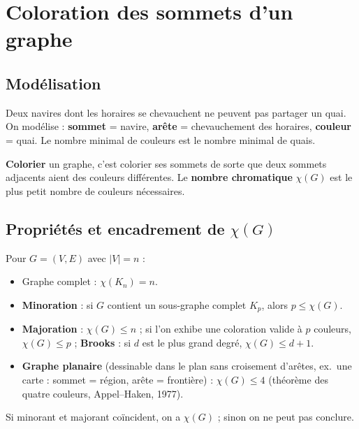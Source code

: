 \documentclass[11pt,a4paper]{article}
\begin{document}
\section{Coloration des sommets d'un graphe}

\subsection{Modélisation}
\begin{exemple}
Deux navires dont les horaires se chevauchent ne peuvent pas partager un quai. On modélise : \textbf{sommet} = navire, \textbf{arête} = chevauchement des horaires, \textbf{couleur} = quai. Le nombre minimal de couleurs est le nombre minimal de quais.
\end{exemple}

\begin{definition}
\textbf{Colorier} un graphe, c'est colorier ses sommets de sorte que deux sommets adjacents aient des couleurs différentes. Le \textbf{nombre chromatique} $\chi(G)$ est le plus petit nombre de couleurs nécessaires.
\end{definition}

\subsection{Propriétés et encadrement de $\chi(G)$}
\begin{retenir}
Pour $G=(V,E)$ avec $|V|=n$ :
\begin{itemize}[nosep]
\item Graphe complet : $\chi(K_n)=n$.
\item \textbf{Minoration} : si $G$ contient un sous-graphe complet $K_p$, alors $p\le\chi(G)$.
\item \textbf{Majoration} : $\chi(G)\le n$ ; si l'on exhibe une coloration valide à $p$ couleurs, $\chi(G)\le p$ ; \textbf{Brooks} : si $d$ est le plus grand degré, $\chi(G)\le d+1$.
\item \textbf{Graphe planaire} (dessinable dans le plan sans croisement d'arêtes, ex.\ une carte : sommet = région, arête = frontière) : $\chi(G)\le4$ (théorème des quatre couleurs, Appel--Haken, 1977).
\end{itemize}
Si minorant et majorant coïncident, on a $\chi(G)$ ; sinon on ne peut pas conclure.
\end{retenir}
\end{document}
